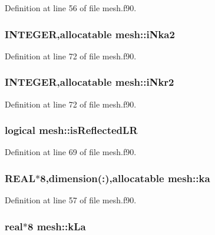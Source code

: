 Definition at line 56 of file mesh.f90.

\hypertarget{namespacemesh_a6103232aa20c5d4619b9016bda1e0cbe}{
\subsubsection[{iNka2}]{\setlength{\rightskip}{0pt plus 5cm}INTEGER,allocatable {\bf mesh::iNka2}}}
\label{namespacemesh_a6103232aa20c5d4619b9016bda1e0cbe}


Definition at line 72 of file mesh.f90.

\hypertarget{namespacemesh_a4a147979d603b0d2f61b08be8bd3e40e}{
\subsubsection[{iNkr2}]{\setlength{\rightskip}{0pt plus 5cm}INTEGER,allocatable {\bf mesh::iNkr2}}}
\label{namespacemesh_a4a147979d603b0d2f61b08be8bd3e40e}


Definition at line 72 of file mesh.f90.

\hypertarget{namespacemesh_ac40d4b15a769844035c498c2ed396e4c}{
\subsubsection[{isReflectedLR}]{\setlength{\rightskip}{0pt plus 5cm}logical {\bf mesh::isReflectedLR}}}
\label{namespacemesh_ac40d4b15a769844035c498c2ed396e4c}


Definition at line 69 of file mesh.f90.

\hypertarget{namespacemesh_acdc9121ee94e3c62c59255106d13fddd}{
\subsubsection[{ka}]{\setlength{\rightskip}{0pt plus 5cm}REAL$\ast$8,dimension(:),allocatable {\bf mesh::ka}}}
\label{namespacemesh_acdc9121ee94e3c62c59255106d13fddd}


Definition at line 57 of file mesh.f90.

\hypertarget{namespacemesh_a9b60e77e26ab439594233774c928b35c}{
\subsubsection[{kLa}]{\setlength{\rightskip}{0pt plus 5cm}real$\ast$8 {\bf mesh::kLa}}}
\label{namespacemesh_a9b60e77e26ab439594233774c928b35c}


